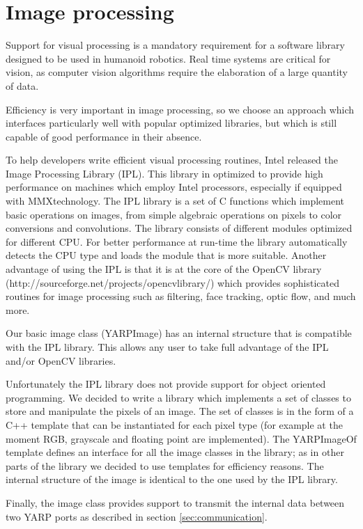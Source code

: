\section{Image processing}

Support for visual processing is a mandatory requirement for a
software library designed to be used in humanoid robotics. Real time
systems are critical for vision, as computer vision algorithms require
the elaboration of a large quantity of data.

Efficiency is very important in image processing, so we choose
an approach which interfaces particularly well with popular
optimized libraries, but which is still capable of good
performance in their absence.

To help developers write efficient visual processing routines, Intel
released the Image Processing Library (IPL). This library in optimized
to provide high performance on machines which employ Intel processors,
especially if equipped with MMX\texttrademark technology. The IPL
library is a set of C functions which implement basic operations on
images, from simple algebraic operations on pixels to color
conversions and convolutions. The library consists of different
modules optimized for different CPU. For better performance at
run-time the library automatically detects the CPU type and loads the
module that is more suitable. Another advantage of using the IPL is
that it is at the core of the OpenCV library
(http://sourceforge.net/projects/opencvlibrary/) which provides 
sophisticated routines for image processing such as filtering, face
tracking, optic flow, and much more.

Our basic image class (YARPImage) has an internal structure that is
compatible with the IPL library.  This allows any user to take full
advantage of the IPL and/or OpenCV libraries.

Unfortunately the IPL library does not provide support for object
oriented programming. We decided to write a library which implements a
set of classes to store and manipulate the pixels of an image. The set
of classes is in the form of a C++ template that can be instantiated
for each pixel type (for example at the moment RGB, grayscale and
floating point are implemented). The YARPImageOf template defines an
interface for all the image classes in the library; as in other parts
of the library we decided to use templates for efficiency reasons. The
internal structure of the image is identical to the one used by the
IPL library. 

Finally, the image class provides support to
transmit the internal data between two YARP ports as described in
section \ref{sec:communication}.

